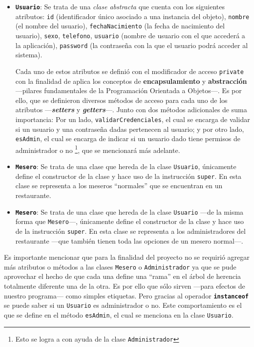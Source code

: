 \begin{itemize}
  \item \textbf{\texttt{Usuario}}: Se trata de una \textit{clase abstracta} 
  que cuenta con los siguientes atributos: \texttt{id} (identificador único 
    asociado a una instancia del objeto), \texttt{nombre} (el nombre del  
    usuario), \texttt{fechaNacimiento} (la fecha de nacimiento del usuario), 
    \texttt{sexo}, \texttt{telefono}, \texttt{usuario} (nombre de usuario con 
    el que accederá a la aplicación), \texttt{password} (la contraseña con la 
    que el usuario podrá acceder al sistema).

  Cada uno de estos atributos se definió con el modificador de acceso 
  \texttt{private} con la finalidad de aplica los conceptos de 
    \textbf{encapsulamiento} y \textbf{abstracción} ---pilares fundamentales 
    de la Programación Orientada a Objetos---. Es por ello, que se definieron 
    diversos métodos de acceso para cada uno de los atributos 
    ---\textbf{\textit{setters}} y \textbf{\textit{getters}}---. Junto con dos 
    métodos adicionales de suma importancia: Por un lado,  
    \texttt{validarCredenciales}, el cual se encarga de validar si un usuario  
    y una contraseña dadas pertenecen al usuario; y por otro lado, 
    \texttt{esAdmin}, el cual se encarga de indicar si un usuario dado tiene 
    permisos de administrador o no \footnote{Esto se logra a con ayuda de la 
    clase \texttt{Administrador}}, que se mencionará más adelante.

  \item \textbf{\texttt{Mesero}}: Se trata de una clase que hereda de la clase 
    \texttt{Usuario}, únicamente define el constructor de la clase y hace uso 
    de la instrucción \texttt{super}. En esta clase se representa a los 
    meseros ``normales'' que se encuentran en un restaurante.

  \item \textbf{\texttt{Mesero}}: Se trata de una clase que hereda de la clase 
    \texttt{Usuario} ---de la misma forma que \texttt{Mesero}---, únicamente 
    define el constructor de la clase y hace uso de la instrucción 
    \texttt{super}. En esta clase se representa a los administradores del 
    restaurante ---que también tienen toda las opciones de un mesero 
    normal---.
\end{itemize}

Es importante mencionar que para la finalidad del proyecto no se requirió 
agregar más atributos o métodos a las clases \texttt{Mesero} o 
\texttt{Administrador} ya que se pude aprovechar el hecho de que cada una 
define una ``rama'' en el árbol de herencia totalmente diferente una de la 
otra. Es por ello que sólo sirven ---para efectos de nuestro programa--- como 
simples etiquetas. Pero gracias al operador \texttt{\textbf{instanceof}} se 
puede saber si un \texttt{Usuario} es administrador o no. Este comportamiento 
es el que se define en el método \texttt{esAdmin}, el cual se menciona en la 
clase \texttt{Usuario}.


